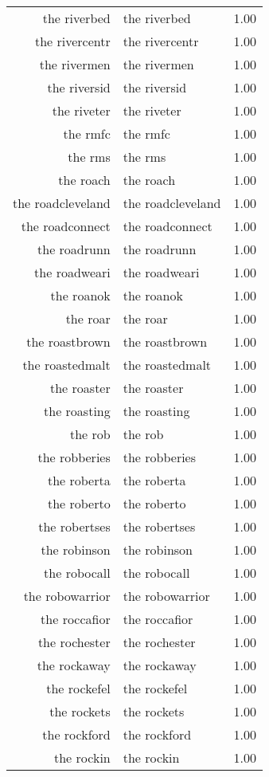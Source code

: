 \begin{table}[ht]
\begin{tabular}{rlr}
  the riverbed & the riverbed & 1.00 \\ 
  the rivercentr & the rivercentr & 1.00 \\ 
  the rivermen & the rivermen & 1.00 \\ 
  the riversid & the riversid & 1.00 \\ 
  the riveter & the riveter & 1.00 \\ 
  the rmfc & the rmfc & 1.00 \\ 
  the rms & the rms & 1.00 \\ 
  the roach & the roach & 1.00 \\ 
  the roadcleveland & the roadcleveland & 1.00 \\ 
  the roadconnect & the roadconnect & 1.00 \\ 
  the roadrunn & the roadrunn & 1.00 \\ 
  the roadweari & the roadweari & 1.00 \\ 
  the roanok & the roanok & 1.00 \\ 
  the roar & the roar & 1.00 \\ 
  the roastbrown & the roastbrown & 1.00 \\ 
  the roastedmalt & the roastedmalt & 1.00 \\ 
  the roaster & the roaster & 1.00 \\ 
  the roasting & the roasting & 1.00 \\ 
  the rob & the rob & 1.00 \\ 
  the robberies & the robberies & 1.00 \\ 
  the roberta & the roberta & 1.00 \\ 
  the roberto & the roberto & 1.00 \\ 
  the robertses & the robertses & 1.00 \\ 
  the robinson & the robinson & 1.00 \\ 
  the robocall & the robocall & 1.00 \\ 
  the robowarrior & the robowarrior & 1.00 \\ 
  the roccafior & the roccafior & 1.00 \\ 
  the rochester & the rochester & 1.00 \\ 
  the rockaway & the rockaway & 1.00 \\ 
  the rockefel & the rockefel & 1.00 \\ 
  the rockets & the rockets & 1.00 \\ 
  the rockford & the rockford & 1.00 \\ 
  the rockin & the rockin & 1.00 \\ 

\end{tabular}
\end{table}
